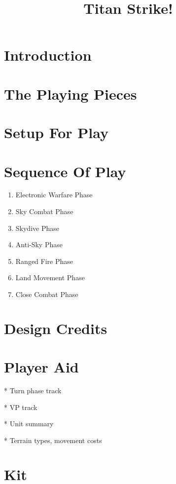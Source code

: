 \documentclass[10pt]{article}
\title{Titan Strike!}
\begin{document}
\maketitle


\tableofcontents


\begin{multicols}{2}

\section{Introduction}
\section{The Playing Pieces}
\section{Setup For Play}
\section{Sequence Of Play}

\begin{enumerate}
  \item Electronic Warfare Phase
  \item Sky Combat Phase
  \item Skydive Phase
  \item Anti-Sky Phase
  \item Ranged Fire Phase
  \item Land Movement Phase
  \item Close Combat Phase
\end{enumerate}

\section*{Design Credits}

\end{multicols}

\section*{Player Aid}

* Turn phase track

* VP track

* Unit summary

* Terrain types, movement costs

\section*{Kit}
\end{document}
